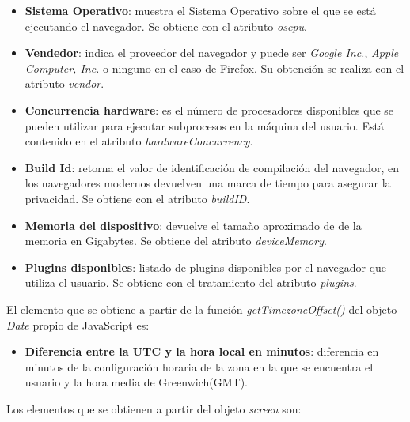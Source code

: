 \begin{itemize}
    \item \textbf{Sistema Operativo}: muestra el Sistema Operativo sobre el que se está ejecutando el navegador. Se obtiene con el atributo \textit{oscpu}.
    \item \textbf{Vendedor}: indica el proveedor del navegador y puede ser \textit{Google Inc.}, \textit{Apple Computer, Inc.} o ninguno en el caso de Firefox. Su obtención se realiza con el atributo \textit{vendor}.
    \item \textbf{Concurrencia hardware}: es el número de procesadores disponibles que se pueden utilizar para ejecutar subprocesos en la máquina del usuario. Está contenido en el atributo \textit{hardwareConcurrency}.
    \item \textbf{Build Id}: retorna el valor de identificación de compilación del navegador, en los navegadores modernos devuelven una marca de tiempo para asegurar la privacidad. Se obtiene con el atributo \textit{buildID}.
    \item \textbf{Memoria del dispositivo}: devuelve el tamaño aproximado de de la memoria en Gigabytes. Se obtiene del atributo \textit{deviceMemory}.
     \item \textbf{Plugins disponibles}: listado de plugins disponibles por el navegador que utiliza el usuario. Se obtiene con el tratamiento del atributo \textit{plugins}.
\end{itemize}
\noindent El elemento que se obtiene a partir de la función \textit{getTimezoneOffset()} del objeto \textit{Date} propio de JavaScript es:
\begin{itemize} 
    \item \textbf{Diferencia entre la UTC y la hora local en minutos}: diferencia en minutos de la configuración horaria de la zona en la que se encuentra el usuario y la hora media de Greenwich(GMT).
\end{itemize}
\noindent  Los elementos que se obtienen a partir del objeto \textit{screen} son:
